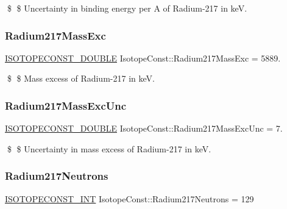 \$ \$ Uncertainty in binding energy per A of Radium-\/217 in keV. \mbox{\label{group___isotope_const-_radium-_ra217_ga8b1c77ea4319be4b36ef5f9e537c050d}} 
\subsubsection{\texorpdfstring{Radium217\+Mass\+Exc}{Radium217MassExc}}
{\footnotesize\ttfamily \mbox{\hyperlink{group___isotope_const-_macros_ga8f45a7272ce02c0b4c65c44636ed719a}{I\+S\+O\+T\+O\+P\+E\+C\+O\+N\+S\+T\+\_\+\+D\+O\+U\+B\+LE}} Isotope\+Const\+::\+Radium217\+Mass\+Exc = 5889.}

\$ \$ Mass excess of Radium-\/217 in keV. \mbox{\label{group___isotope_const-_radium-_ra217_ga51da3f7743e7ec97f99a608468c21ad0}} 
\subsubsection{\texorpdfstring{Radium217\+Mass\+Exc\+Unc}{Radium217MassExcUnc}}
{\footnotesize\ttfamily \mbox{\hyperlink{group___isotope_const-_macros_ga8f45a7272ce02c0b4c65c44636ed719a}{I\+S\+O\+T\+O\+P\+E\+C\+O\+N\+S\+T\+\_\+\+D\+O\+U\+B\+LE}} Isotope\+Const\+::\+Radium217\+Mass\+Exc\+Unc = 7.}

\$ \$ Uncertainty in mass excess of Radium-\/217 in keV. \mbox{\label{group___isotope_const-_radium-_ra217_ga2ca2b206f0264935ad996e8ffa860881}} 
\subsubsection{\texorpdfstring{Radium217\+Neutrons}{Radium217Neutrons}}
{\footnotesize\ttfamily \mbox{\hyperlink{group___isotope_const-_macros_ga5f18360b3e99483a35c32d789e62621c}{I\+S\+O\+T\+O\+P\+E\+C\+O\+N\+S\+T\+\_\+\+I\+NT}} Isotope\+Const\+::\+Radium217\+Neutrons = 129}


